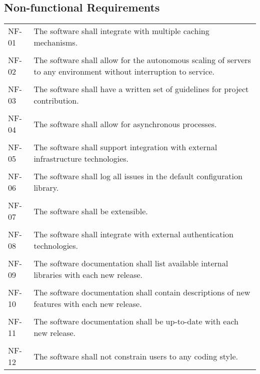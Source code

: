 \subsection{Non-functional Requirements}

\begin{table}[H]
    \begin{tabular}{l p{13cm}}
    NF-01 & The software shall integrate with multiple caching mechanisms.\\\\
    NF-02 & The software shall allow for the autonomous scaling of servers to any environment without interruption to service.\\\\
    NF-03 & The software shall have a written set of guidelines for project contribution.\\\\
    NF-04 & The software shall allow for asynchronous processes.\\\\
    NF-05 & The software shall support integration with external infrastructure technologies.\\\\
    NF-06 & The software shall log all issues in the default configuration library.\\\\
    NF-07 & The software shall be extensible.\\\\
    NF-08 & The software shall integrate with external authentication technologies.\\\\
    NF-09 & The software documentation shall list available internal libraries with each new release.\\\\
    NF-10 & The software documentation shall contain descriptions of new features with each new release.\\\\
    NF-11 & The software documentation shall be up-to-date with each new release.\\\\
    NF-12 & The software shall not constrain users to any coding style.                                        
    \end{tabular}
    \end{table}